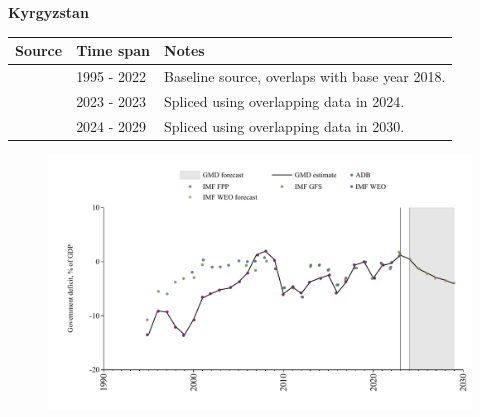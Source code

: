 \documentclass[12pt,a4paper,landscape]{article}
\begin{document}
\begin{adjustbox}{max totalsize={\paperwidth}{\paperheight},center}
\begin{minipage}[t][\textheight][t]{\textwidth}
\vspace*{0.5cm}
{}
\begin{center}
{\Large\bfseries Kyrgyzstan}
\end{center}
\vspace{0.5cm}
\begin{table}[H]
\centering
\small
\begin{tabular}{|l|l|l|}
\hline
\textbf{Source} & \textbf{Time span} & \textbf{Notes} \\
\hline
\rowcolor{white}\cite{IMF_WEO}& 1995 - 2022 &Baseline source, overlaps with base year 2018.\\
\rowcolor{lightgray}\cite{IMF_GFS}& 2023 - 2023 &Spliced using overlapping data in 2024.\\
\rowcolor{white}\cite{IMF_WEO_forecast}& 2024 - 2029 &Spliced using overlapping data in 2030.\\
\hline
\end{tabular}
\end{table}
\begin{figure}[H]
\centering
\includegraphics[width=\textwidth,height=0.6\textheight,keepaspectratio]{graphs/KGZ_govdef_GDP.pdf}
\end{figure}
\end{minipage}
\end{adjustbox}
\end{document}
